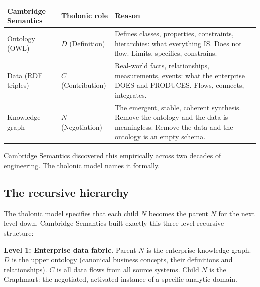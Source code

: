 \documentclass[12pt]{article}
\begin{document}
\begin{longtable}[]{@{}
  >{\raggedright\arraybackslash}p{}
  >{\raggedright\arraybackslash}p{}
  >{\raggedright\arraybackslash}p{}@{}}
\toprule\noalign{}
\begin{minipage}[b]{\linewidth}\raggedright
Cambridge Semantics
\end{minipage} & \begin{minipage}[b]{\linewidth}\raggedright
Tholonic role
\end{minipage} & \begin{minipage}[b]{\linewidth}\raggedright
Reason
\end{minipage} \\
\midrule\noalign{}
\endhead
\bottomrule\noalign{}
\endlastfoot
Ontology (OWL) & \(D\) (Definition) & Defines classes, properties,
constraints, hierarchies: what everything IS. Does not flow. Limits,
specifies, constrains. \\
Data (RDF triples) & \(C\) (Contribution) & Real-world facts,
relationships, measurements, events: what the enterprise DOES and
PRODUCES. Flows, connects, integrates. \\
Knowledge graph & \(N\) (Negotiation) & The emergent, stable, coherent
synthesis. Remove the ontology and the data is meaningless. Remove the
data and the ontology is an empty schema. \\
\end{longtable}

Cambridge Semantics discovered this empirically across two decades of
engineering. The tholonic model names it formally.

\subsection{The recursive hierarchy}\label{the-recursive-hierarchy}

The tholonic model specifies that each child \(N\) becomes the parent
\(N\) for the next level down. Cambridge Semantics built exactly this
three-level recursive structure:

\textbf{Level 1: Enterprise data fabric.} Parent \(N\) is the enterprise
knowledge graph. \(D\) is the upper ontology (canonical business
concepts, their definitions and relationships). \(C\) is all data flows
from all source systems. Child \(N\) is the Graphmart: the negotiated,
activated instance of a specific analytic domain.
\end{document}
